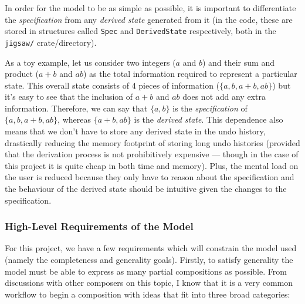 \documentclass[12pt]{article}
\begin{document}
In order for the model to be as simple as possible, it is important to differentiate the
\emph{specification} from any \emph{derived state} generated from it (in the code, these are stored
in structures called \verb|Spec| and \verb|DerivedState| respectively, both in the \verb|jigsaw/|
crate/directory).

As a toy example, let us consider two integers ($a$ and $b$) and their sum and product ($a + b$ and
$ab$) as the total information required to represent a particular state.  This overall state
consists of 4 pieces of information ($\{a, b, a + b, ab\}$) but it's easy to see that the inclusion
of $a + b$ and $ab$ does not add any extra information.  Therefore, we can say that $\{a, b\}$ is
the \emph{specification} of $\{a, b, a + b, ab\}$, whereas $\{a + b, ab\}$ is the \emph{derived
state}.  This dependence also means that we don't have to store any derived state in the undo
history, drastically reducing the memory footprint of storing long undo histories (provided that the
derivation process is not prohibitively expensive --- though in the case of this project it is quite
cheap in both time and memory).  Plus, the mental load on the user is reduced because they only have
to reason about the specification and the behaviour of the derived state should be intuitive given
the changes to the specification.

\subsubsection{High-Level Requirements of the Model}

For this project, we have a few requirements which will constrain the model used (namely the
completeness and generality goals).  Firstly, to satisfy generality the model must be able to
express as many partial compositions as possible.  From discussions with other composers on this
topic, I know that it is a very common workflow to begin a composition with ideas that fit into
three broad categories:
\end{document}
